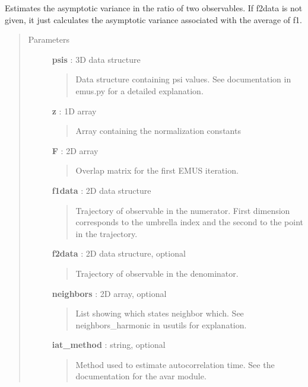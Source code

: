 \documentclass[letterpaper,10pt,english]{sphinxmanual}
\begin{document}
\begin{fulllineitems}
\label{modules/avar:avar.avar_obs}
Estimates the asymptotic variance in the ratio of two observables.
If f2data is not given, it just calculates the asymptotic variance
associated with the average of f1.
\begin{quote}\begin{description}
\item[{Parameters}] \leavevmode
\textbf{psis} : 3D data structure
\begin{quote}

Data structure containing psi values.  See documentation in emus.py for a detailed explanation.
\end{quote}

\textbf{z} : 1D array
\begin{quote}

Array containing the normalization constants
\end{quote}

\textbf{F} : 2D array
\begin{quote}

Overlap matrix for the first EMUS iteration.
\end{quote}

\textbf{f1data} : 2D data structure
\begin{quote}

Trajectory of observable in the numerator.  First dimension corresponds to the umbrella index and the second to the point in the trajectory.
\end{quote}

\textbf{f2data} : 2D data structure, optional
\begin{quote}

Trajectory of observable in the denominator.
\end{quote}

\textbf{neighbors} : 2D array, optional
\begin{quote}

List showing which states neighbor which.  See neighbors\_harmonic in usutils for explanation.
\end{quote}

\textbf{iat\_method} : string, optional
\begin{quote}

Method used to estimate autocorrelation time.  See the documentation for the avar module.
\end{quote}


\end{description}
\end{quote}
\end{fulllineitems}
\end{document}
